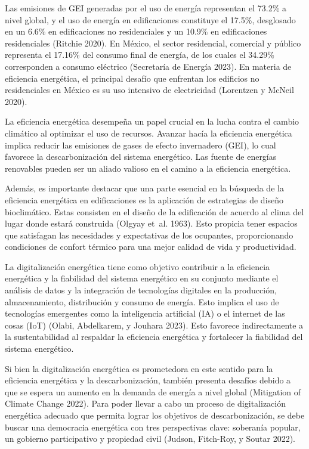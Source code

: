 \documentclass[
  letterpaper,
  DIV=11,
  numbers=noendperiod]{scrreport}
\begin{document}
Las emisiones de GEI generadas por el uso de energía representan el
73.2\% a nivel global, y el uso de energía en edificaciones constituye
el 17.5\%, desglosado en un 6.6\% en edificaciones no residenciales y un
10.9\% en edificaciones residenciales (Ritchie 2020). En México, el
sector residencial, comercial y público representa el 17.16\% del
consumo final de energía, de los cuales el 34.29\% corresponden a
consumo eléctrico (Secretaría de Energía 2023). En materia de eficiencia
energética, el principal desafío que enfrentan los edificios no
residenciales en México es su uso intensivo de electricidad (Lorentzen y
McNeil 2020).

La eficiencia energética desempeña un papel crucial en la lucha contra
el cambio climático al optimizar el uso de recursos. Avanzar hacía la
eficiencia energética implica reducir las emisiones de gases de efecto
invernadero (GEI), lo cual favorece la descarbonización del sistema
energético. Las fuente de energías renovables pueden ser un aliado
valioso en el camino a la eficiencia energética.

Además, es importante destacar que una parte esencial en la búsqueda de
la eficiencia energética en edificaciones es la aplicación de
estrategias de diseño bioclimático. Estas consisten en el diseño de la
edificación de acuerdo al clima del lugar donde estará construida
(Olgyay et~al. 1963). Esto propicia tener espacios que satisfagan las
necesidades y expectativas de los ocupantes, proporcionando condiciones
de confort térmico para una mejor calidad de vida y productividad.

La digitalización energética tiene como objetivo contribuir a la
eficiencia energética y la fiabilidad del sistema energético en su
conjunto mediante el análisis de datos y la integración de tecnologías
digitales en la producción, almacenamiento, distribución y consumo de
energía. Esto implica el uso de tecnologías emergentes como la
inteligencia artificial (IA) o el internet de las cosas (IoT) (Olabi,
Abdelkarem, y Jouhara 2023). Esto favorece indirectamente a la
sustentabilidad al respaldar la eficiencia energética y fortalecer la
fiabilidad del sistema energético.

Si bien la digitalización energética es prometedora en este sentido para
la eficiencia energética y la descarbonización, también presenta
desafíos debido a que se espera un aumento en la demanda de energía a
nivel global (Mitigation of Climate Change 2022). Para poder llevar a
cabo un proceso de digitalización energética adecuado que permita lograr
los objetivos de descarbonización, se debe buscar una democracia
energética con tres perspectivas clave: soberanía popular, un gobierno
participativo y propiedad civil (Judson, Fitch-Roy, y Soutar 2022).
\end{document}
